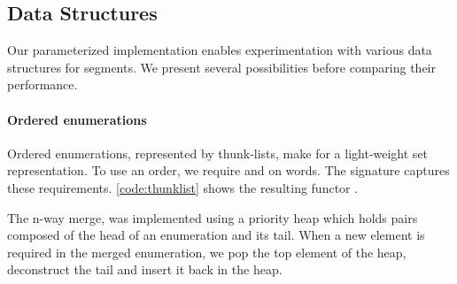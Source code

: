 

\subsection{Data Structures}

Our parameterized implementation enables experimentation with various
data structures for segments. We present several possibilities before
comparing their performance.

\paragraph{Ordered enumerations}

Ordered enumerations, represented by thunk-lists, make
for a light-weight set representation.
To use an order, we require  and
 on words.  The  signature
captures these requirements. \autoref{code:thunklist} shows the
resulting functor .



The n-way merge, 
was implemented using a priority heap which holds pairs composed
of the head of an enumeration and its tail. When a new element is required in the
merged enumeration, we pop the top element of the heap, deconstruct
the tail and insert it back in the heap.

